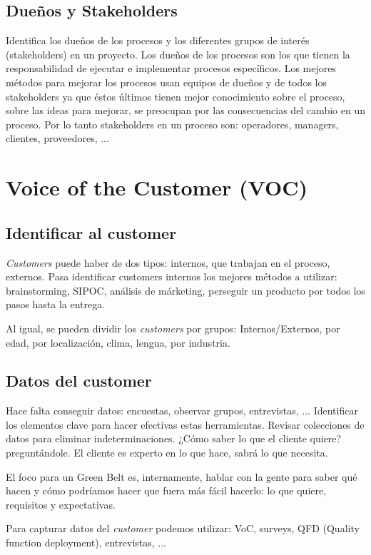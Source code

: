 \documentclass[]{article}
\begin{document}
\subsection{Dueños y Stakeholders}

Identifica los dueños de los procesos y los diferentes grupos de interés (stakeholders) en un proyecto.
Los dueños de los procesos son los que tienen la responsabilidad de ejecutar e implementar procesos específicos. Los mejores métodos para mejorar los procesos usan equipos de dueños y de todos los stakeholders ya que éstos últimos tienen mejor conocimiento sobre el proceso, sobre las ideas para mejorar, se preocupan por las consecuencias del cambio en un proceso. Por lo tanto stakeholders en un proceso son: operadores, managers, clientes, proveedores, ...

\section{Voice of the Customer (VOC)}

\subsection{Identificar al customer}
\textit{Customers} puede haber de dos tipos: internos, que trabajan en el proceso, externos. Pasa identificar customers internos los mejores métodos a utilizar: brainstorming, SIPOC, análisis de márketing, perseguir un producto por todos los pasos hasta la entrega.

Al igual, se pueden dividir los \textit{customers} por grupos: Internos/Externos, por edad, por localización, clima, lengua, por industria.

\subsection{Datos del customer}

Hace falta conseguir datos: encuestas, observar grupos, entrevistas, ... Identificar los elementos clave para hacer efectivas estas herramientas. Revisar colecciones de datos para eliminar indeterminaciones.
¿Cómo saber lo que el cliente quiere? preguntándole. El cliente es experto en lo que hace, sabrá lo que necesita. 

El foco para un Green Belt es, internamente, hablar con la gente para saber qué hacen y cómo podríamos hacer que fuera más fácil hacerlo: lo que quiere, requisitos y expectativas. 

Para capturar datos del \textit{customer} podemos utilizar: VoC, surveys, QFD (Quality function deployment), entrevistas, ...
\end{document}
